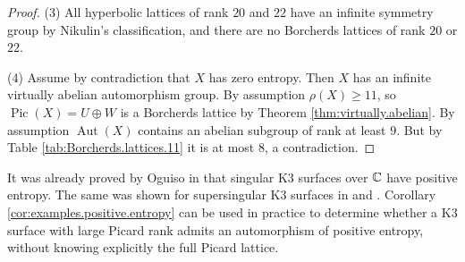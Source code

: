 \documentclass[11pt,letterpaper]{amsart}
\DeclareMathOperator{\rk}{rk}
\DeclareMathOperator{\Aut}{Aut}
\DeclareMathOperator{\Pic}{Pic}
\begin{document}
\begin{proof}
   (3) All hyperbolic lattices of rank $20$ and $22$ have an infinite symmetry group by Nikulin's classification, and there are no Borcherds lattices of rank $20$ or $22$.
   
    (4) Assume by contradiction that $X$ has zero entropy. Then $X$ has an infinite virtually abelian automorphism group. By assumption $\rho(X)\ge 11$, so $\Pic(X)=U\oplus W$ is a Borcherds lattice by Theorem \ref{thm:virtually.abelian}. By assumption $\Aut(X)$ contains an abelian subgroup of rank at least $9$. 
    But by Table \ref{tab:Borcherds.lattices.11} it is at most 8, a contradiction.
\end{proof}

It was already proved by Oguiso in \cite[Theorem~1.6]{oguiso.entropy} that singular K3 surfaces over $\mathbb{C}$ have positive entropy. The same was shown for supersingular K3 surfaces in \cite{yu.salem} and \cite{brandhorst.22}.
Corollary \ref{cor:examples.positive.entropy} can be used in practice to determine whether a K3 surface with large Picard rank admits an automorphism of positive entropy, without knowing explicitly the full Picard lattice.
\end{document}

